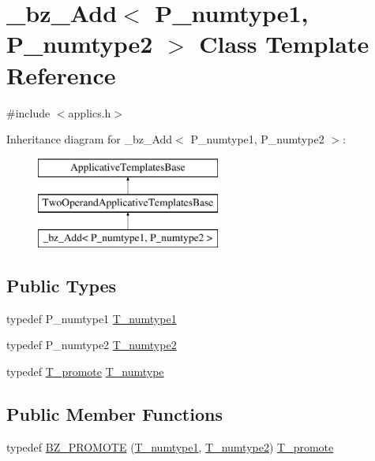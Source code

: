 \hypertarget{class__bz__Add}{}\section{\+\_\+bz\+\_\+\+Add$<$ P\+\_\+numtype1, P\+\_\+numtype2 $>$ Class Template Reference}
\label{class__bz__Add}


{\ttfamily \#include $<$applics.\+h$>$}

Inheritance diagram for \+\_\+bz\+\_\+\+Add$<$ P\+\_\+numtype1, P\+\_\+numtype2 $>$\+:\begin{figure}[H]
\begin{center}
\leavevmode
\includegraphics[height=3.000000cm]{class__bz__Add}
\end{center}
\end{figure}
\subsection*{Public Types}
\begin{DoxyCompactItemize}
\item 
typedef P\+\_\+numtype1 \hyperlink{class__bz__Add_a7df5a3ad6bd933efe078b898382b5e87}{T\+\_\+numtype1}
\item 
typedef P\+\_\+numtype2 \hyperlink{class__bz__Add_a3f2d47d956dab9c2bd471cb465656f54}{T\+\_\+numtype2}
\item 
typedef \hyperlink{minmax_8h_aaa88a440c2f0d00798d5b1d42c79308d}{T\+\_\+promote} \hyperlink{class__bz__Add_a8dff31e1bd85f8a25c0812c3c8ef34c5}{T\+\_\+numtype}
\end{DoxyCompactItemize}
\subsection*{Public Member Functions}
\begin{DoxyCompactItemize}
\item 
typedef \hyperlink{class__bz__Add_ab36eb7c619e94d23d11747aa67fd27e2}{B\+Z\+\_\+\+P\+R\+O\+M\+O\+T\+E} (\hyperlink{class__bz__Add_a7df5a3ad6bd933efe078b898382b5e87}{T\+\_\+numtype1}, \hyperlink{class__bz__Add_a3f2d47d956dab9c2bd471cb465656f54}{T\+\_\+numtype2}) \hyperlink{minmax_8h_aaa88a440c2f0d00798d5b1d42c79308d}{T\+\_\+promote}
\end{DoxyCompactItemize}
